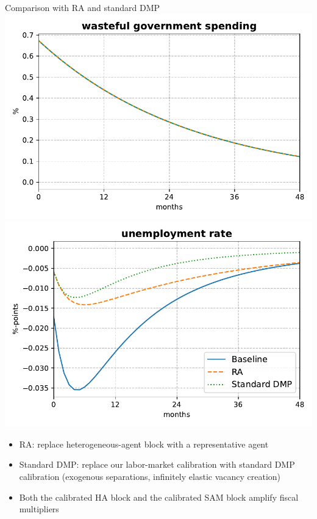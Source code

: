 \documentclass[aspectratio=169]{beamer}
\begin{document}
\begin{frame}{Comparison with RA and standard DMP}
	\includegraphics[scale=0.45]{results/IRF_G_compare_titled.pdf}
    \hfill
    \includegraphics[scale=0.45]{results/IRF_u_compare_titled.pdf}

\begin{itemize}
	\item RA: replace heterogeneous-agent block with a representative agent
	\item Standard DMP: replace our labor-market calibration with standard DMP calibration (exogenous separations, infinitely elastic vacancy creation)
	\item Both the calibrated HA block and the calibrated SAM block amplify fiscal multipliers
\end{itemize}
\end{frame}
\end{document}
